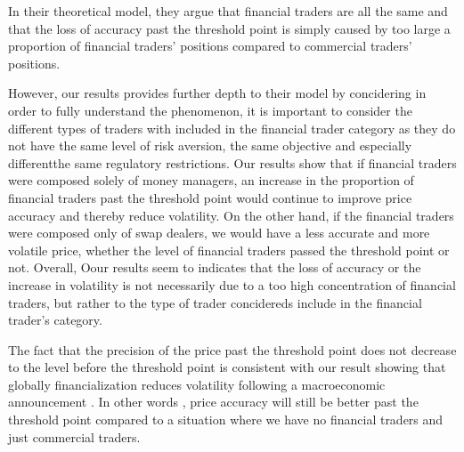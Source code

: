 \documentclass[12pt]{article}
\begin{document}
In their theoretical model, they argue that financial traders are all the same and that the loss of accuracy past the threshold point is simply caused by too large a proportion of financial traders’ positions compared to commercial traders’ positions. 

However, our results provides further depth to their model by concidering in order to fully understand the phenomenon, it is important to consider the different types of traders with included in the financial trader category as they do not have the same level of risk aversion, the same objective and especially differentthe same regulatory restrictions. Our results show that if financial traders were composed solely of money managers, an increase in the proportion of financial traders past the threshold point would continue to improve price accuracy and thereby reduce volatility. On the other hand, if the financial traders were composed only of swap dealers, we would have a less accurate and more volatile price, whether the level of financial traders passed the threshold point or not. Overall, Oour results seem to indicates that the loss of accuracy or the increase in volatility is not necessarily due to a too high concentration of financial traders, but rather to the type of trader concidereds include in the financial trader’s category.

The fact that the precision of the price past the threshold point does not decrease to the level before the threshold point is consistent with our result showing that globally financialization reduces volatility following a macroeconomic announcement . In other words , price accuracy will still be better past the threshold point compared to a situation where we have no financial traders and just commercial traders.
\end{document}
